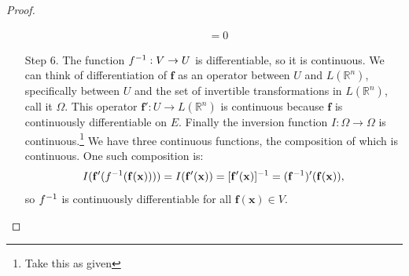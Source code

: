 \documentclass{article}
\newcommand{\R}{\mathbb{R}}
\newcommand{\x}{\mathbf{x}}
\newcommand{\f}{\mathbf{f}}
\theoremstyle{definition}
\begin{document}
\begin{proof}
\begin{enumerate}
{\begin{align*}
					& = 0 
			\end{align*}}
			\item [Step 6.] The function $ \mathbf \f^{-1}:V\to U $ is differentiable, so it is continuous. We can think of differentiation of $ \f $ as an operator between $ U $ and $ L(\R^n) $, specifically between $ U $ and the set of invertible transformations in $ L(\R^n) $, call it $ \Omega $. This operator $ \f':U\to L(\R^n) $ is continuous because $ \f $ is continuously differentiable on $ E $. Finally the inversion function $ I:\Omega \to \Omega $ is continuous.\footnote{Take this as given} We have three continuous functions, the composition of which is continuous. One such composition is: 
			$$I(\f'(\mathbf \f^{-1}(\f(\x)))) =I(\f'(\x)) =[\f'(\x)]^{-1}= (\f^{-1})'(\f(\x)) ,$$ so $ \mathbf \f^{-1} $ is continuously differentiable for all $ \f(\x)\in V $.
		\end{enumerate}
	\end{proof}
	
	
	
\end{document}
